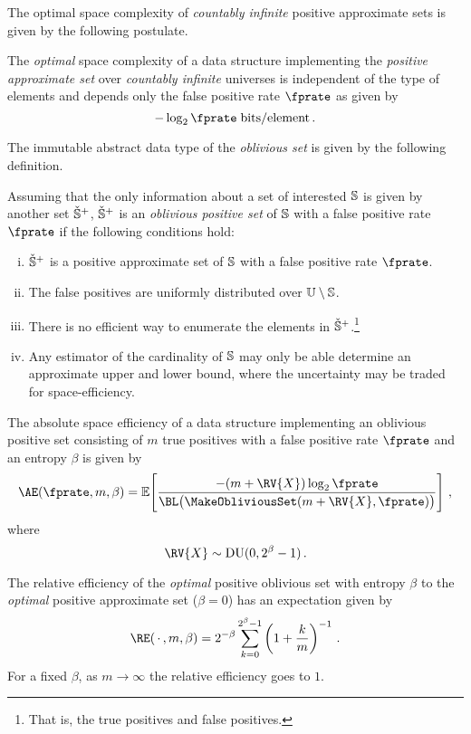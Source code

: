 \documentclass[ ../main.tex]{subfiles}
\begin{document}
The optimal space complexity of \emph{countably infinite} positive approximate sets is given by the following postulate.
\begin{postulate}
The \emph{optimal} space complexity of a data structure implementing the \emph{positive approximate set} over \emph{countably infinite} universes is independent of the type of elements and depends only the false positive rate $\fprate$ as given by
\begin{equation}
    -\log_2 \fprate \; \si{bits \per element}\,.
\end{equation}
\end{postulate}

The immutable abstract data type of the \emph{oblivious set}\cite{obset} is given by the following definition.
\begin{definition}
\label{def:obliviousset}
Assuming that the only information about a set of interested $\mathbb{S}$ is given by another set $\check{\mathbb{S}}^+$, $\check{\mathbb{S}}^+$ is an \emph{oblivious positive set} of $\mathbb{S}$ with a false positive rate $\fprate$ if the following conditions hold:
\begin{enumerate}[(i)]
    \item $\check{\mathbb{S}}^+$ is a positive approximate set of $\mathbb{S}$ with a false positive rate $\fprate$.
    \item The false positives are uniformly distributed over $\mathbb{U} \setminus \mathbb{S}$.
    \item There is no efficient way to enumerate the elements in $\check{\mathbb{S}}^+$.\footnote{That is, the true positives and false positives.}
    \item Any estimator of the cardinality of $\mathbb{S}$ may only be able determine an approximate upper and lower bound, where the uncertainty may be traded for space-efficiency.
\end{enumerate}
\end{definition}

The absolute space efficiency of a data structure implementing an oblivious positive set consisting of $m$ true positives with a false positive rate $\fprate$ and an entropy $\beta$ is given by
\begin{equation}
    \AE(\fprate, m, \beta) = \expectation\!\left[\frac{-(m + \RV{X}) \log_2 \fprate}{\BL\!\left(\MakeObliviousSet(m + \RV{X},\fprate)\right)}\right]\,,
\end{equation}
where
\begin{equation}
    \RV{X} \sim \dudist(0,2^\beta - 1)\,.
\end{equation}

The relative efficiency of the \emph{optimal} positive oblivious set with entropy $\beta$ to the \emph{optimal} positive approximate set ($\beta = 0$) has an expectation given by
\begin{equation}
    \RE(\,\cdot\,, m, \beta) = 2^{-\beta} \sum_{k=0}^{2^\beta-1} \left(1 + \frac{k}{m}\right)^{-1}\,.
\end{equation}
For a fixed $\beta$, as $m \to \infty$ the relative efficiency goes to $1$.
\end{document}
